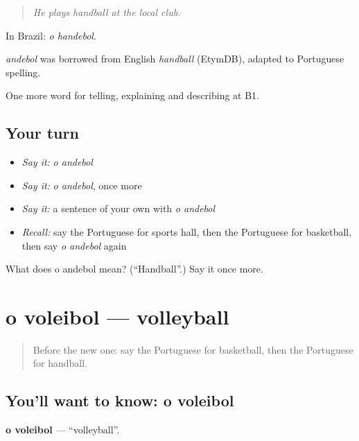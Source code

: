 \begin{quote}
\emph{He plays handball at the local club.}
\end{quote}

In Brazil: \emph{o handebol}.

\begin{cousinweb}
\emph{andebol} was borrowed from English \emph{handball} (EtymDB), adapted to Portuguese spelling.
\end{cousinweb}

\begin{grammarlens}[title={What you've built}]
One more word for telling, explaining and describing at B1.
\end{grammarlens}

\subsection*{Your turn}
\begin{itemize}
\raggedright
  \item \emph{Say it:} \emph{o andebol}
  \item \emph{Say it:} \emph{o andebol}, once more
  \item \emph{Say it:} a sentence of your own with \emph{o andebol}
  \item \emph{Recall:} say the Portuguese for sports hall, then the Portuguese for basketball, then say \emph{o andebol} again
\end{itemize}

\begin{tcolorbox}[breakable,colback=teal!4,colframe=teal!35!black,title={Before you move on}]
What does o andebol mean? (\textquotedblleft{}Handball\textquotedblright{}.) Say it once more.
\end{tcolorbox}
\section[o voleibol]{o voleibol — volleyball}

\label{lesson:PT-C512-voleibol}



\begin{quote}
Before the new one: say the Portuguese for basketball, then the Portuguese for handball.
\end{quote}

\subsection*{You'll want to know: o voleibol}
\textbf{o voleibol} — \textquotedblleft{}volleyball\textquotedblright{}.

